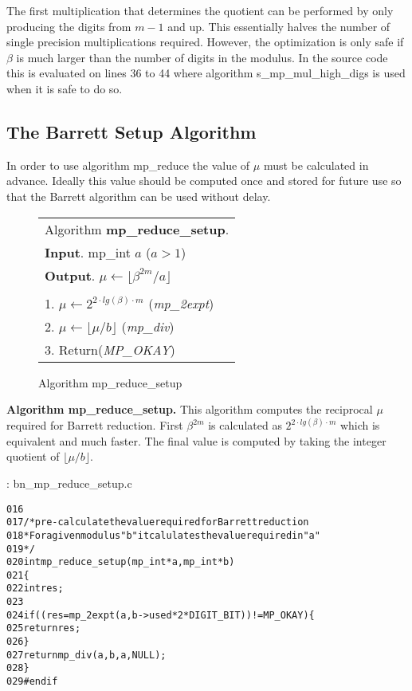 \documentclass[b5paper]{book}
\begin{document}
The first multiplication that determines the quotient can be performed by only producing the digits from $m - 1$ and up.  This essentially halves
the number of single precision multiplications required.  However, the optimization is only safe if $\beta$ is much larger than the number of digits
in the modulus.  In the source code this is evaluated on lines 36 to 44 where algorithm s\_mp\_mul\_high\_digs is used when it is
safe to do so.  

\subsection{The Barrett Setup Algorithm}
In order to use algorithm mp\_reduce the value of $\mu$ must be calculated in advance.  Ideally this value should be computed once and stored for
future use so that the Barrett algorithm can be used without delay.  

\begin{figure}[!here]
\begin{small}
\begin{center}
\begin{tabular}{l}
\hline Algorithm \textbf{mp\_reduce\_setup}. \\
\textbf{Input}.   mp\_int $a$ ($a > 1$)  \\
\textbf{Output}.  $\mu \leftarrow \lfloor \beta^{2m}/a \rfloor$ \\
\hline \\
1.  $\mu \leftarrow 2^{2 \cdot lg(\beta) \cdot  m}$ (\textit{mp\_2expt}) \\
2.  $\mu \leftarrow \lfloor \mu / b \rfloor$ (\textit{mp\_div}) \\
3.  Return(\textit{MP\_OKAY}) \\
\hline
\end{tabular}
\end{center}
\end{small}
\caption{Algorithm mp\_reduce\_setup}
\end{figure}

\textbf{Algorithm mp\_reduce\_setup.}
This algorithm computes the reciprocal $\mu$ required for Barrett reduction.  First $\beta^{2m}$ is calculated as $2^{2 \cdot lg(\beta) \cdot  m}$ which
is equivalent and much faster.  The final value is computed by taking the integer quotient of $\lfloor \mu / b \rfloor$.

\vspace{+3mm}\begin{small}
\hspace{-5.1mm}{\bf File}: bn\_mp\_reduce\_setup.c
\vspace{-3mm}
\begin{alltt}
016   
017   /* pre-calculate the value required for Barrett reduction
018    * For a given modulus "b" it calulates the value required in "a"
019    */
020   int mp_reduce_setup (mp_int * a, mp_int * b)
021   \{
022     int     res;
023     
024     if ((res = mp_2expt (a, b->used * 2 * DIGIT_BIT)) != MP_OKAY) \{
025       return res;
026     \}
027     return mp_div (a, b, a, NULL);
028   \}
029   #endif
\end{alltt}
\end{small}
\end{document}
